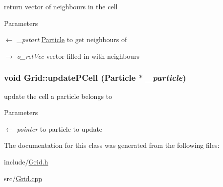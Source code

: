 return vector of neighbours in the cell 
\begin{DoxyParams}{Parameters}
\item[\mbox{$\leftarrow$} {\em \_\-pstart}]\hyperlink{classParticle}{Particle} to get neighbours of \item[\mbox{$\rightarrow$} {\em o\_\-retVec}]vector filled in with neighbours \end{DoxyParams}
\hypertarget{classGrid_a2e82b95aada21472f5ffb9a4cd9d8ca6}{
\subsubsection[{updatePCell}]{\setlength{\rightskip}{0pt plus 5cm}void Grid::updatePCell ({\bf Particle} $\ast$ {\em \_\-particle})}}
\label{classGrid_a2e82b95aada21472f5ffb9a4cd9d8ca6}


update the cell a particle belongs to 
\begin{DoxyParams}{Parameters}
\item[\mbox{$\leftarrow$} {\em pointer}]to particle to update \end{DoxyParams}


The documentation for this class was generated from the following files:\begin{DoxyCompactItemize}
\item 
include/\hyperlink{Grid_8h}{Grid.h}\item 
src/\hyperlink{Grid_8cpp}{Grid.cpp}\end{DoxyCompactItemize}
